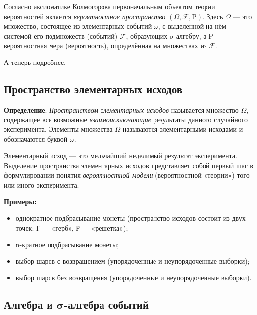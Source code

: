 \documentclass[11pt,a4paper]{article}
\providecommand{\tightlist}{%
      \setlength{\itemsep}{0pt}\setlength{\parskip}{0pt}}
\begin{document}
Согласно аксиоматике Колмогорова первоначальным объектом теории
вероятностей является \emph{вероятностное пространство}
\((\Omega, \mathcal{F}, \mathrm{P})\). Здесь \(\Omega\) --- это
множество, состоящее из элементарных событий \(\omega\), с выделенной на
нём системой его подмножеств (событий) \(\mathcal{F}\), образующих
\(\sigma\)-алгебру, а \(\mathrm{P}\) --- вероятностная мера
(вероятность), определённая на множествах из \(\mathcal{F}\).

А теперь подробнее.

    \hypertarget{ux43fux440ux43eux441ux442ux440ux430ux43dux441ux442ux432ux43e-ux44dux43bux435ux43cux435ux43dux442ux430ux440ux43dux44bux445-ux438ux441ux445ux43eux434ux43eux432}{%
\subsection{Пространство элементарных
исходов}\label{ux43fux440ux43eux441ux442ux440ux430ux43dux441ux442ux432ux43e-ux44dux43bux435ux43cux435ux43dux442ux430ux440ux43dux44bux445-ux438ux441ux445ux43eux434ux43eux432}}

\textbf{Определение}. \emph{Пространством элементарных исходов}
называется множество \(\Omega\), содержащее все возможные
\emph{взаимоисключающие} результаты данного случайного эксперимента.
Элементы множества \(\Omega\) называются элементарными исходами и
обозначаются буквой \(\omega\).

Элементарный исход --- это мельчайший неделимый результат
эксперимента.\\
Выделение пространства элементарных исходов представляет собой первый
шаг в формулировании понятия \emph{вероятностной модели} (вероятностной
«теории») того или иного эксперимента.

    \textbf{Примеры:}

\begin{itemize}
\tightlist
\item
  однократное подбрасывание монеты (пространство исходов состоит из двух
  точек: Г --- «герб», Р --- «решетка»);
\item
  n-кратное подбрасывание монеты;
\item
  выбор шаров с возвращением (упорядоченные и неупорядоченные выборки);
\item
  выбор шаров без возвращения (упорядоченные и неупорядоченные выборки).
\end{itemize}

    \hypertarget{ux430ux43bux433ux435ux431ux440ux430-ux438-mathbfsigma-ux430ux43bux433ux435ux431ux440ux430-ux441ux43eux431ux44bux442ux438ux439}{%
\subsection{\texorpdfstring{Алгебра и \(\mathbf{\sigma}\)-алгебра
событий}{Алгебра и \textbackslash{}mathbf\{\textbackslash{}sigma\}-алгебра событий}}\label{ux430ux43bux433ux435ux431ux440ux430-ux438-mathbfsigma-ux430ux43bux433ux435ux431ux440ux430-ux441ux43eux431ux44bux442ux438ux439}}
\end{document}
